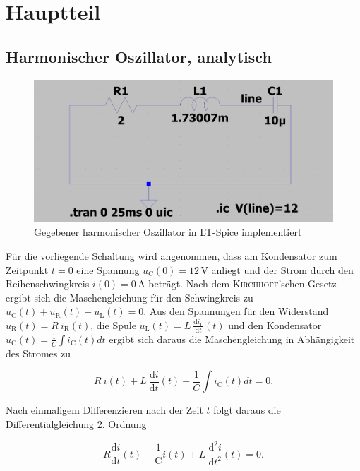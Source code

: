 
\chapter{Hauptteil}
	\section{Harmonischer Oszillator, analytisch}\label{sec:ag2.1}
	\begin{figure}[h]
		\centering
		\includegraphics[width=\textwidth]{data/harmOsz}
		\caption{Gegebener harmonischer Oszillator in LT-Spice implementiert}
		\label{oszillator}
	\end{figure}
	Für die vorliegende Schaltung wird angenommen, dass am Kondensator zum Zeitpunkt $t = 0$ eine Spannung $u_\mathrm{C}(0) = 12\,$V anliegt und der Strom durch den Reihenschwingkreis $i(0) = 0\,$A beträgt. Nach dem \textsc{Kirchhoff}'schen Gesetz ergibt sich die Maschengleichung für den Schwingkreis zu $u_\mathrm{C}(t) + u_\mathrm{R}(t) + u_\mathrm{L}(t) = 0$. Aus den Spannungen für den Widerstand $u_\mathrm{R}(t) = R \: i_\mathrm{R}(t)$, die Spule $u_\mathrm{L}(t) = L\: \frac{\mathrm{d}i_\mathrm{L}}{\mathrm{d}t}(t)$ und den Kondensator $u_\mathrm{C}(t) = \frac{1}{C} \int i_\mathrm{C}(t)dt $ ergibt sich daraus die Maschengleichung in Abhängigkeit des Stromes zu 
	
	\begin{equation*}
		R\:i(t) + L\: \frac{\mathrm{d}i}{\mathrm{d}t}(t) + \frac{1}{C} \int i_\mathrm{C}(t)dt = 0.
	\end{equation*}
	
	Nach einmaligem Differenzieren nach der Zeit $t$ folgt daraus die Differentialgleichung 2. Ordnung 
	
	\begin{equation}
		R  \frac{\mathrm{d}i}{\mathrm{d}t}(t) + \frac{1}{\mathrm{C}} i(t) +  L\: \frac{\mathrm{d^2}i}{\mathrm{d}t^2}(t) = 0.
		\label{eq:it1}
	\end{equation}
	
